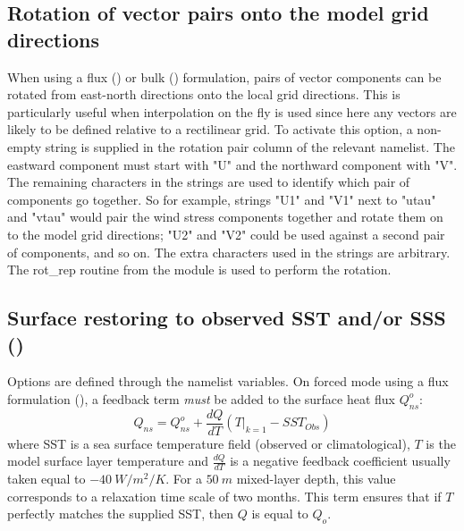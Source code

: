 \documentclass[../main/NEMO_manual]{subfiles}
\begin{document}
\subsection{Rotation of vector pairs onto the model grid directions}
\label{subsec:SBC_rotation}

When using a flux () or bulk () formulation,
pairs of vector components can be rotated from east-north directions onto the local grid directions.
This is particularly useful when interpolation on the fly is used since here any vectors are likely to
be defined relative to a rectilinear grid.
To activate this option, a non-empty string is supplied in the rotation pair column of the relevant namelist.
The eastward component must start with "U" and the northward component with "V".
The remaining characters in the strings are used to identify which pair of components go together.
So for example, strings "U1" and "V1" next to "utau" and "vtau" would pair the wind stress components together and
rotate them on to the model grid directions;
"U2" and "V2" could be used against a second pair of components, and so on.
The extra characters used in the strings are arbitrary.
The rot\_rep routine from the  module is used to perform the rotation.

\subsection[Surface restoring to observed SST and/or SSS (\textit{sbcssr.F90})]{Surface restoring to observed SST and/or SSS (\protect{})}
\label{subsec:SBC_ssr}

\begin{listing}
  \caption{}
  \label{lst:namsbc_ssr}
\end{listing}

Options are defined through the  namelist variables.
On forced mode using a flux formulation (),
a feedback term \emph{must} be added to the surface heat flux $Q_{ns}^o$:
\[
  Q_{ns} = Q_{ns}^o + \frac{dQ}{dT} \left( \left. T \right|_{k=1} - SST_{Obs} \right)
\]
where SST is a sea surface temperature field (observed or climatological),
$T$ is the model surface layer temperature and
$\frac{dQ}{dT}$ is a negative feedback coefficient usually taken equal to $-40~W/m^2/K$.
For a $50~m$ mixed-layer depth, this value corresponds to a relaxation time scale of two months.
This term ensures that if $T$ perfectly matches the supplied SST, then $Q$ is equal to $Q_o$.
\end{document}

